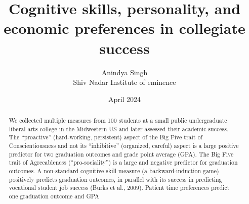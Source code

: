 \documentclass[12pt,a4paper]{article}
\begin{document}
\title{Cognitive skills, personality, and economic preferences in collegiate success}
\maketitle
\setcounter{page}{0}

\centering

\vspace*{\fill}

{\author{Anindya Singh \\ \large Shiv Nadar Institute of eminence}}

\vspace{1cm}

{\date{April 2024}}

\vspace*{\fill}

\newpage
\begin{abstract}
    We collected multiple measures from 100 students at a small public undergraduate liberal
arts college in the Midwestern US and later assessed their academic success. The “proactive” (hard-working, persistent) aspect of the Big Five trait of Conscientiousness and not its
“inhibitive” (organized, careful) aspect is a large positive predictor for two graduation outcomes and grade point average (GPA). The Big Five trait of Agreeableness (“pro-sociality”)
is a large and negative predictor for graduation outcomes. A non-standard cognitive skill
measure (a backward-induction game) positively predicts graduation outcomes, in parallel
with its success in predicting vocational student job success (Burks et al., 2009). Patient
time preferences predict one graduation outcome and GPA
\end{abstract}
\newpage
\end{document}
